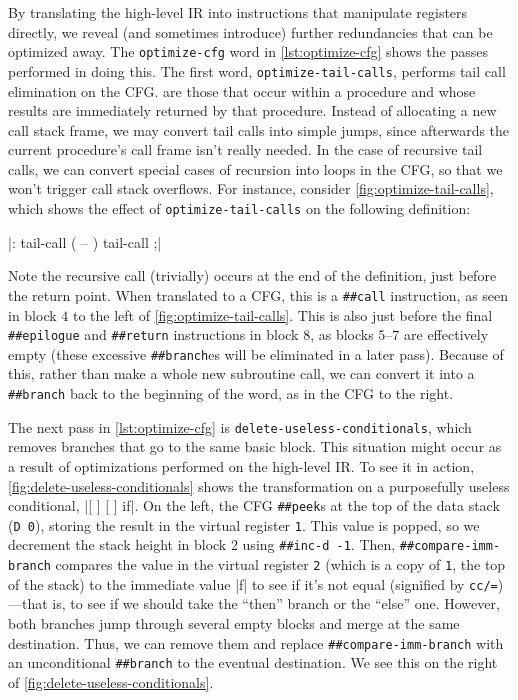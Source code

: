 By translating the high-level \gls{IR} into instructions that manipulate
registers directly, we reveal (and sometimes introduce) further redundancies
that can be optimized away.  The \Verb|optimize-cfg| word in
\vref{lst:optimize-cfg} shows the passes performed in doing this.  The first
word, \Verb|optimize-tail-calls|, performs tail call elimination on the
\gls{CFG}.
%
 are those that occur within a procedure and whose results are
immediately returned by that procedure.  Instead of allocating a new call stack
frame, we may convert tail calls into simple jumps, since afterwards the
current procedure's call frame isn't really needed.  In the case of recursive
tail calls, we can convert special cases of recursion into loops in the
\gls{CFG}, so that we won't trigger call stack overflows.  For instance,
consider \vref{fig:optimize-tail-calls}, which shows the effect of
\Verb|optimize-tail-calls| on the following definition:
%
\begin{center}
%
  \factor|: tail-call ( -- ) tail-call ;|
%
\end{center}
%
\noindent Note the recursive call (trivially) occurs at the end of the
definition, just before the return point.  When translated to a \gls{CFG}, this
is a \Verb|##call| instruction, as seen in block $4$ to the left of
\vref{fig:optimize-tail-calls}.  This is also just before the final
\Verb|##epilogue| and \Verb|##return| instructions in block $8$, as blocks
$5$--$7$ are effectively empty (these excessive \Verb|##branch|es will be
eliminated in a later pass).  Because of this, rather than make a whole new
subroutine call, we can convert it into a \Verb|##branch| back to the beginning
of the word, as in the \gls{CFG} to the right.



The next pass in \vref{lst:optimize-cfg} is \Verb|delete-useless-conditionals|,
which removes branches that go to the same basic block.  This situation might
occur as a result of optimizations performed on the high-level \gls{IR}.  To
see it in action, \vref{fig:delete-useless-conditionals} shows the
transformation on a purposefully useless conditional,
%
\factor|[ ] [ ] if|.
%
On the left, the \gls{CFG} \Verb|##peek|s at the top of the data stack
%
(\Verb|D 0|),
%
storing the result in the virtual register \Verb|1|.  This value is popped,
so we decrement the stack height
%
in block $2$ using \Verb|##inc-d -1|.
%
Then, \Verb|##compare-imm-branch| compares the value in the virtual register
\Verb|2| (which is a copy of \Verb|1|, the top of the stack) to the immediate
value \factor|f| to see if it's not equal (signified by \Verb|cc/=|)---that is,
to see if we should take the ``then'' branch or the ``else'' one.  However,
both branches jump through several empty blocks and merge at the same
destination.  Thus, we can remove them and replace \Verb|##compare-imm-branch|
with an unconditional \Verb|##branch| to the eventual destination.  We see this
on the right of \vref{fig:delete-useless-conditionals}.

